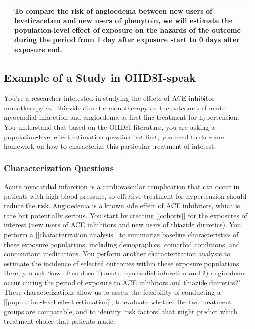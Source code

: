 \documentclass[11pt]{book}
\theoremstyle{definition}
\theoremstyle{definition}
\theoremstyle{definition}
\theoremstyle{remark}
\begin{document}
\begin{longtable}[]{@{}lll@{}}
\begin{minipage}[t]{0.30\columnwidth}
\end{minipage} & \begin{minipage}[t]{0.30\columnwidth}\raggedright
To compare the risk of \textbf{angioedema} between new users of \textbf{levetiracetam} and new users of \textbf{phenytoin}, we will estimate the population-level effect of exposure on the \textbf{hazards} of the outcome during the period from \textbf{1 day after exposure start} to \textbf{0 days after exposure end}.\strut
\end{minipage}\tabularnewline
\bottomrule
\end{longtable}

\hypertarget{example-of-a-study-in-ohdsi-speak}{%
\subsection{Example of a Study in OHDSI-speak}\label{example-of-a-study-in-ohdsi-speak}}

You're a researcher interested in studying the effects of ACE inhibitor monotherapy vs.~thiazide diuretic monotherapy on the outcomes of acute myocardial infarction and angioedema as first-line treatment for hypertension. You understand that based on the OHDSI literature, you are asking a population-level effect estimation question but first, you need to do some homework on how to characterize this particular treatment of interest.

\hypertarget{characterization-questions}{%
\subsubsection{Characterization Questions}\label{characterization-questions}}

Acute myocardial infarction is a cardiovascular complication that can occur in patients with high blood pressure, so effective treatment for hypertension should reduce the risk. Angioedema is a known side effect of ACE inhibitors, which is rare but potentially serious. You start by creating {[}{[}cohorts{]}{]} for the exposures of interest (new users of ACE inhibitors and new users of thiazide diuretics). You perform a {[}{[}characterization analysis{]}{]} to summarize baseline characteristics of these exposure populations, including demographics, comorbid conditions, and concomitant medications. You perform another characterization analysis to estimate the incidence of selected outcomes within these exposure populations. Here, you ask `how often does 1) acute myocardial infarction and 2) angioedema occur during the period of exposure to ACE inhibitors and thiazide diuretics?' These characterizations allow us to assess the feasibility of conducting a {[}{[}population-level effect estimation{]}{]}, to evaluate whether the two treatment groups are comparable, and to identify `risk factors' that might predict which treatment choice that patients made.
\end{document}
